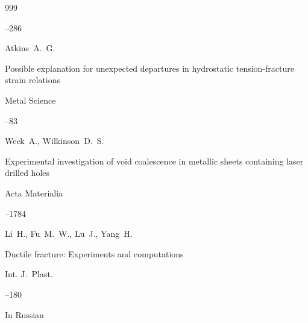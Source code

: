 \begin{thebibliography}{999}



–286






\by Atkins~A.~G. 

\paper Possible explanation for unexpected departures in hydrostatic tension-fracture strain relations

\jour Metal Science




--83






\by Weck~A., Wilkinson~D.~S. 

\paper Experimental investigation of void coalescence in metallic sheets containing laser drilled holes

\jour Acta Materialia




--1784






\by Li~H., Fu~M.~W., Lu~J., Yang~H. 

\paper Ductile fracture: Experiments and computations

\jour Int. J.~Plast.  




--180






\lang In Russian


\end{thebibliography}
